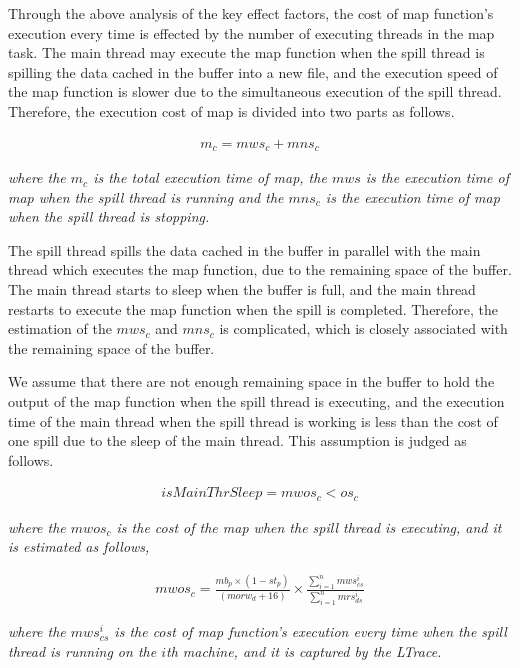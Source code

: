 Through the above analysis of the key effect factors, the cost of map function's execution every time is effected by the number of executing threads in the map task. The main thread may execute the map function when the spill thread is spilling the data cached in the buffer into a new file, and the execution speed of the map function is slower due to the simultaneous execution of the spill thread. Therefore, the execution cost of map is divided into two parts as follows.
\begin{small}
\begin{equation}
\begin{split}
m_c=mws_c+mns_c
\end{split}
\end{equation}
\end{small}
\emph{where the $m_c$ is the total execution time of map, the $mws$ is the execution time of map when the spill thread is running and the $mns_c$ is the execution time of map when the spill thread is stopping.}

The spill thread spills the data cached in the buffer in parallel with the main thread which executes the map function, due to the remaining space of the buffer. The main thread starts to sleep when the buffer is full, and the main thread restarts to execute the map function when the spill is completed. Therefore, the estimation of the $mws_c$ and $mns_c$ is complicated, which is closely associated with the remaining space of the buffer.

We assume that there are not enough remaining space in the buffer to hold the output of the map function when the spill thread is executing, and the execution time of the main thread when the spill thread is working is less than the cost of one spill due to the sleep of the main thread. This assumption is judged as follows.
\begin{small}
\begin{equation}
\begin{split}
isMainThrSleep=mwos_c<os_c \nonumber
\end{split}
\end{equation}
\end{small}
\emph{where the $mwos_c$ is the cost of the map when the spill thread is executing, and it is estimated as follows,}
\begin{small}
\begin{equation}
\begin{split}
mwos_c=\frac{mb_p\times (1-st_p)}{(morw_d+16)} \times\frac{\sum_{i=1}^nmws_{cs}^i}{\sum_{i=1}^nmrs_{ds}^i} \nonumber
\end{split}
\end{equation}
\end{small}
\emph{where the $mws_{cs}^i$ is the cost of map function's execution every time when the spill thread is running on the $i$th machine, and it is captured by the LTrace.}

